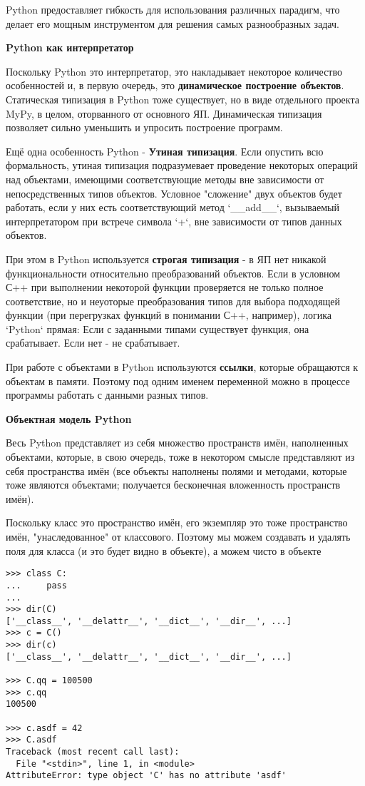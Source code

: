 Python предоставляет гибкость для использования различных парадигм, что делает его мощным инструментом для решения самых разнообразных задач.


\textbf{Python как интерпретатор}

Поскольку Python это интерпретатор, это накладывает некоторое количество особенностей и, в первую очередь, это \textbf{динамическое построение объектов}. Статическая типизация в Python тоже существует, но в виде отдельного проекта MyPy, в целом, оторванного от основного ЯП. Динамическая типизация позволяет сильно уменьшить и упросить построение программ.

Ещё одна особенность Python - \textbf{Утиная типизация}. Если опустить всю формальность, утиная типизация подразумевает проведение некоторых операций над объектами, имеющими соответствующие методы вне зависимости от непосредственных типов объектов. Условное "сложение" двух объектов будет работать, если у них есть соответствующий метод `__add__`, вызываемый интерпретатором при встрече символа `+`, вне зависимости от типов данных объектов.

При этом в Python используется \textbf{строгая типизация} - в ЯП нет никакой функциональности относительно преобразований объектов. Если в условном С++ при выполнении некоторой функции проверяется не только полное соответствие, но и неуоторые преобразования типов для выбора подходящей функции (при перегрузках функций в понимании С++, например), логика `Python` прямая: Если с заданными типами существует функция, она срабатывает. Если нет - не срабатывает.

При работе с объектами в Python используются \textbf{ссылки}, которые обращаются к объектам в памяти. Поэтому под одним именем переменной можно в процессе программы работать с данными разных типов.

\textbf{Объектная модель Python}

Весь Python представляет из себя множество пространств имён, наполненных объектами, которые, в свою очередь, тоже в некотором смысле представляют из себя пространства имён (все объекты наполнены полями и методами, которые тоже являются объектами; получается бесконечная вложенность пространств имён).

Поскольку класс это пространство имён, его экземпляр это тоже пространство имён, "унаследованное" от классового. Поэтому мы можем создавать и удалять поля для класса (и это будет видно в объекте), а можем чисто в объекте

\begin{verbatim}
>>> class C:
...     pass
...
>>> dir(C)
['__class__', '__delattr__', '__dict__', '__dir__', ...]
>>> c = C()
>>> dir(c)
['__class__', '__delattr__', '__dict__', '__dir__', ...]

>>> C.qq = 100500
>>> c.qq
100500

>>> c.asdf = 42
>>> C.asdf
Traceback (most recent call last):
  File "<stdin>", line 1, in <module>
AttributeError: type object 'C' has no attribute 'asdf'
\end{verbatim}

